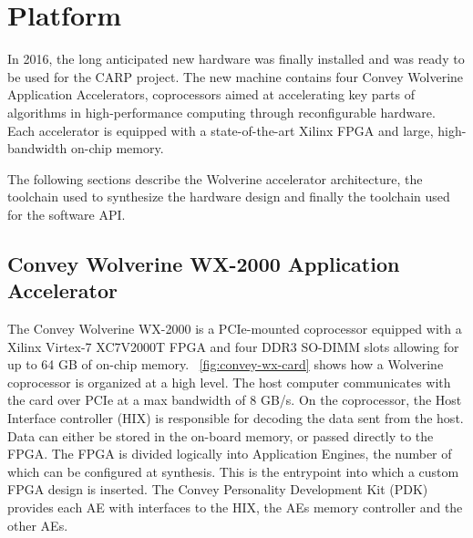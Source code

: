 
\chapter{Platform}
\label{chp:platform}

In 2016, the long anticipated new hardware was finally installed and was ready
to be used for the CARP project. The new machine contains four Convey Wolverine
Application Accelerators, coprocessors aimed at accelerating key parts of
algorithms in high-performance computing through reconfigurable hardware. Each
accelerator is equipped with a state-of-the-art Xilinx FPGA and large,
high-bandwidth on-chip memory.

The following sections describe the Wolverine accelerator architecture, the
toolchain used to synthesize the hardware design and finally the toolchain used
for the software API.

\section{Convey Wolverine WX-2000 Application Accelerator}
\label{sec:coproc}

The Convey Wolverine WX-2000 is a PCIe-mounted coprocessor equipped with a
Xilinx Virtex-7 XC7V2000T FPGA and four DDR3 SO-DIMM slots allowing for up to 64
GB of on-chip memory. \figurename~\ref{fig:convey-wx-card} shows how a Wolverine
coprocessor is organized at a high level. The host computer communicates with
the card over PCIe at a max bandwidth of 8 GB/s. On the coprocessor, the Host
Interface controller (HIX) is responsible for decoding the data sent from the
host. Data can either be stored in the on-board memory, or passed directly to
the FPGA. The FPGA is divided logically into Application Engines, the number of
which can be configured at synthesis. This is the entrypoint into which a custom
FPGA design is inserted. The Convey Personality Development Kit (PDK) provides
each AE with interfaces to the HIX, the AEs memory controller and the other AEs.

